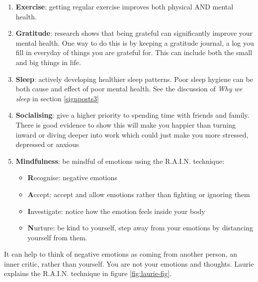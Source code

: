 \documentclass[
]{book}
\providecommand{\tightlist}{%
  \setlength{\itemsep}{0pt}\setlength{\parskip}{0pt}}
\begin{document}
\begin{enumerate}
\def\labelenumi{\arabic{enumi}.}
\tightlist
\item
  \textbf{Exercise}: getting regular exercise improves both physical AND mental health.
\item
  \textbf{Gratitude}: research shows that being grateful can significantly improve your mental health. One way to do this is by keeping a gratitude journal, a log you fill in everyday of things you are grateful for. This can include both the small and big things in life.
\item
  \textbf{Sleep}: actively developing healthier sleep patterns. Poor sleep hygiene can be both cause and effect of poor mental health. See the discussion of \emph{Why we sleep} \citep{whywesleep} in section \ref{signposts3}
\item
  \textbf{Socialising}: give a higher priority to spending time with friends and family. There is good evidence to show this will make you happier than turning inward or diving deeper into work which could just make you more stressed, depressed or anxious \citep{lauranxiety}
\item
  \textbf{Mindfulness}: be mindful of emotions using the R.A.I.N. technique:

  \begin{itemize}
  \tightlist
  \item
    \textbf{R}ecognise: negative emotions
  \item
    \textbf{A}ccept: accept and allow emotions rather than fighting or ignoring them
  \item
    \textbf{I}nvestigate: notice how the emotion feels inside your body
  \item
    \textbf{N}urture: be kind to yourself, step away from your emotions by distancing yourself from them.
  \end{itemize}
\end{enumerate}

It can help to think of negative emotions as coming from another person, an inner critic, rather than yourself. You are not your emotions and thoughts. Laurie explains the R.A.I.N. technique in figure \ref{fig:laurie-fig}.
\end{document}
